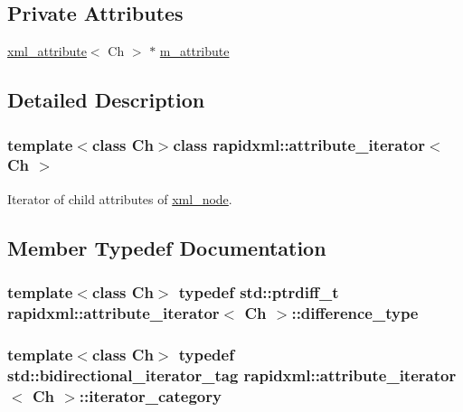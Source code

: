 \subsection*{Private Attributes}
\begin{DoxyCompactItemize}
\item 
\hyperlink{classrapidxml_1_1xml__attribute}{xml\+\_\+attribute}$<$ Ch $>$ $\ast$ \hyperlink{classrapidxml_1_1attribute__iterator_a2b4de1b0d86015beeae10e9997438c7a}{m\+\_\+attribute}
\end{DoxyCompactItemize}


\subsection{Detailed Description}
\subsubsection*{template$<$class Ch$>$class rapidxml\+::attribute\+\_\+iterator$<$ Ch $>$}

Iterator of child attributes of \hyperlink{classrapidxml_1_1xml__node}{xml\+\_\+node}. 

\subsection{Member Typedef Documentation}
\hypertarget{classrapidxml_1_1attribute__iterator_accfd6d8527d32b427496b42f71a2e37a}{}
\subsubsection[{difference\+\_\+type}]{\setlength{\rightskip}{0pt plus 5cm}template$<$class Ch$>$ typedef std\+::ptrdiff\+\_\+t {\bf rapidxml\+::attribute\+\_\+iterator}$<$ Ch $>$\+::{\bf difference\+\_\+type}}\label{classrapidxml_1_1attribute__iterator_accfd6d8527d32b427496b42f71a2e37a}
\hypertarget{classrapidxml_1_1attribute__iterator_a97ac5d8b98f5b03c68cc566f5ac0a9e0}{}
\subsubsection[{iterator\+\_\+category}]{\setlength{\rightskip}{0pt plus 5cm}template$<$class Ch$>$ typedef std\+::bidirectional\+\_\+iterator\+\_\+tag {\bf rapidxml\+::attribute\+\_\+iterator}$<$ Ch $>$\+::{\bf iterator\+\_\+category}}\label{classrapidxml_1_1attribute__iterator_a97ac5d8b98f5b03c68cc566f5ac0a9e0}
\hypertarget{classrapidxml_1_1attribute__iterator_a69acc2e60270d6a062c03c9cb1cf2aa7}{}
